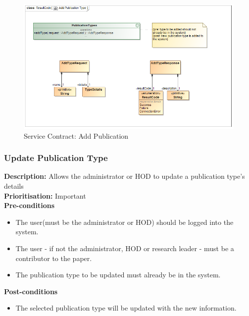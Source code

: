 \documentclass[a4paper]{article}
\begin{document}
            
            \begin{figure}[H]
            	\centering
            	\includegraphics[width=\textwidth]{../Assignment1/5.1.8.Add.Publication.Type.Services.Contract.png}
            	\caption{Service Contract: Add Publication}
            \end{figure}
        
        \pagebreak
    \subsubsection{Update Publication Type}
        
        \textbf{Description:} Allows the administrator or HOD to update a publication type's details\\
        \textbf{Prioritisation:} Important\\
        
        
        \textbf{Pre-conditions}
         \begin{itemize}
            \item The user(must be the administrator or HOD) should be logged into the system.
            \item The user - if not the administrator, HOD or research leader - must be a contributor to the paper.
            \item The publication type to be updated must already be in the system.
       \end{itemize}
        
        \textbf{Post-conditions}
        \begin{itemize}
            \item The selected publication type will be updated with the new information.
        \end{itemize}
        
\end{document}
